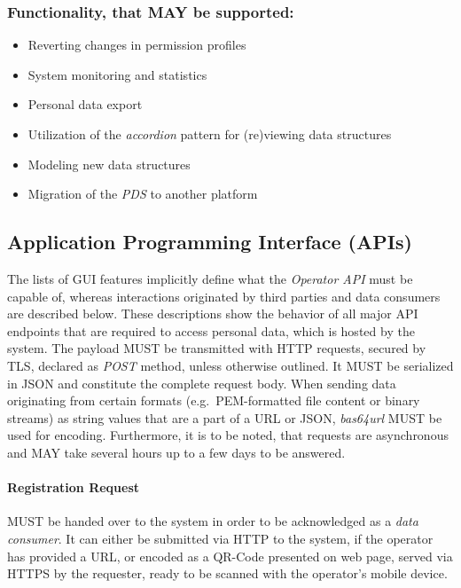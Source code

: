 \documentclass[12pt,english,a4paper,titlepage,cleardoublepage=empty,dottedtoc]{report}
\providecommand{\tightlist}{%
  \setlength{\itemsep}{0pt}\setlength{\parskip}{0pt}}
\begin{document}
\subsubsection{Functionality, that MAY be
supported:}\label{functionality-that-may-be-supported}

\begin{itemize}
\tightlist
\item
  Reverting changes in permission profiles
\item
  System monitoring and statistics
\item
  Personal data export
\item
  Utilization of the \emph{accordion} pattern for (re)viewing data
  structures
\item
  Modeling new data structures
\item
  Migration of the \emph{PDS} to another platform
\end{itemize}

\subsection{Application Programming Interface
(APIs)}\label{application-programming-interface-apis}

The lists of GUI features implicitly define what the \emph{Operator API}
must be capable of, whereas interactions originated by third parties and
data consumers are described below. These descriptions show the behavior
of all major API endpoints that are required to access personal data,
which is hosted by the system. The payload MUST be transmitted with HTTP
requests, secured by TLS, declared as \emph{POST} method, unless
otherwise outlined. It MUST be serialized in JSON and constitute the
complete request body. When sending data originating from certain
formats (e.g.~PEM-formatted file content or binary streams) as string
values that are a part of a URL or JSON, \emph{bas64url} MUST be used
for encoding. Furthermore, it is to be noted, that requests are
asynchronous and MAY take several hours up to a few days to be answered.

\paragraph{Registration Request}\label{spec_api_registration-request}

MUST be handed over to the system in order to be acknowledged as a
\emph{data consumer}. It can either be submitted via HTTP to the system,
if the operator has provided a URL, or encoded as a QR-Code presented on
web page, served via HTTPS by the requester, ready to be scanned with
the operator's mobile device.
\end{document}
